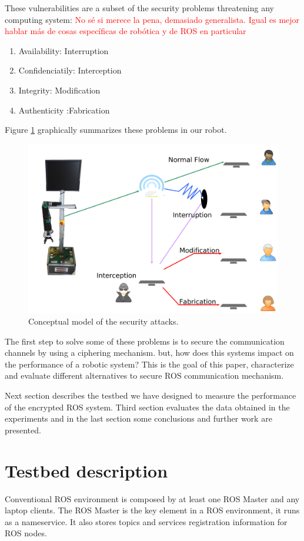 \documentclass[journal,twoside]{JoPhA}
\begin{document}
These vulnerabilities are a subset of the security problems threatening any computing system:
{\textcolor{red}{No s\'e si merece la pena, demasiado generalista. Igual es mejor hablar más de cosas específicas de robótica y de ROS en particular}}
\begin{enumerate}
 \item Availability: Interruption
 \item Confidenciatily: Interception
 \item Integrity: Modification
 \item Authenticity :Fabrication
\end{enumerate}

Figure \ref{fig:Conceptualmodel} graphically summarizes these problems in our robot.

\begin{figure}[ht]
    \centering
    \includegraphics[width=.5\textwidth]{SecurityAttacks.pdf}
    \caption{Conceptual model of the security attacks.}
  \label{fig:Conceptualmodel}
\end{figure}

The first step to solve some of these problems is to secure the communication channels by using a ciphering mechanism. but, how does this systems impact on the performance of a robotic system? This is the goal of this paper, characterize and evaluate different alternatives to secure ROS communication mechanism.

Next section describes the testbed we have designed to measure the performance of the encrypted ROS system. Third section evaluates the data obtained in the experiments and in the last section some conclusions and further work are presented.



\section{Testbed description}

Conventional ROS environment is composed by at least one ROS Master and any laptop clients. The ROS Master is the key element in a ROS environment, it runs as a nameservice.
It also stores topics and services registration information for ROS nodes. 
\end{document}
